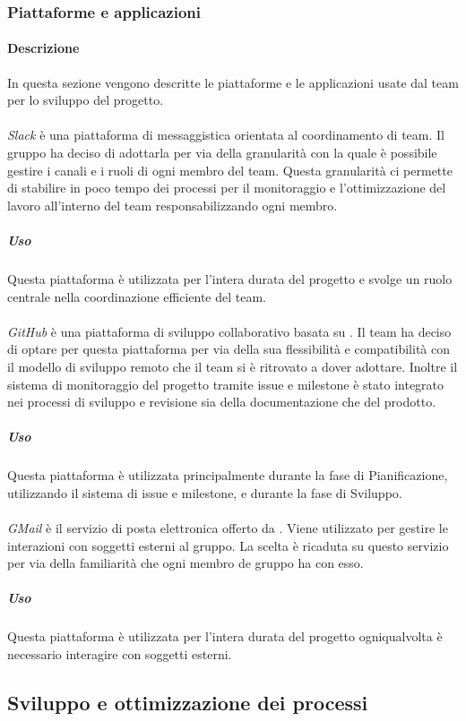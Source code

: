 \subsubsection{Piattaforme e applicazioni}
\paragraph{Descrizione}
In questa sezione vengono descritte le piattaforme e le applicazioni usate dal team per lo sviluppo del progetto.
\paragraph{\textit{}}
\textit{Slack} è una piattaforma di messaggistica orientata al coordinamento di team. Il gruppo ha deciso di adottarla per via della granularità con la quale è possibile gestire i canali e i ruoli di ogni membro del team. Questa granularità ci permette di stabilire in poco tempo dei processi per il monitoraggio e l'ottimizzazione del lavoro all'interno del team responsabilizzando ogni membro.
\subparagraph{Uso}
Questa piattaforma è utilizzata per l'intera durata del progetto e svolge un ruolo centrale nella coordinazione efficiente del team. 

\paragraph{}
\textit{GitHub} è una piattaforma di sviluppo collaborativo basata su . Il team ha deciso di optare per questa piattaforma per via della sua flessibilità e compatibilità con il modello di sviluppo remoto che il team si è ritrovato a dover adottare. Inoltre il sistema di monitoraggio del progetto tramite issue e milestone è stato integrato nei processi di sviluppo e revisione sia della documentazione che del prodotto.
\subparagraph{Uso}
Questa piattaforma è utilizzata principalmente durante la fase di Pianificazione, utilizzando il sistema di issue e milestone, e durante la fase di Sviluppo.

\paragraph{}
\textit{GMail} è il servizio di posta elettronica offerto da . Viene utilizzato per gestire le interazioni con soggetti esterni al gruppo. La scelta è ricaduta su questo servizio per via della familiarità che ogni membro de gruppo ha con esso.
\subparagraph{Uso}
Questa piattaforma è utilizzata per l'intera durata del progetto ogniqualvolta è necessario interagire con soggetti esterni.

\subsection{Sviluppo e ottimizzazione dei processi}

